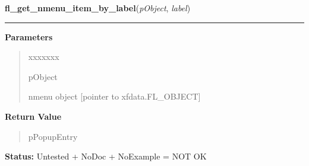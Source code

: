 \hspace{.8\funcindent}\begin{boxedminipage}{\funcwidth}

    \raggedright \textbf{fl\_get\_nmenu\_item\_by\_label}(\textit{pObject}, \textit{label})

    \vspace{-1.5ex}

    \rule{\textwidth}{0.5\fboxrule}
\setlength{\parskip}{2ex}
\setlength{\parskip}{1ex}
      \textbf{Parameters}
      \vspace{-1ex}

      \begin{quote}
        \begin{Ventry}{xxxxxxx}

          \item[pObject]

          nmenu object [pointer to xfdata.FL\_OBJECT]

        \end{Ventry}

      \end{quote}

      \textbf{Return Value}
    \vspace{-1ex}

      \begin{quote}
      pPopupEntry

      \end{quote}

\textbf{Status:} Untested + NoDoc + NoExample = NOT OK



    \end{boxedminipage}

    \label{xformslib:library:fl_get_nmenu_item_by_text}

    \vspace{0.5ex}

